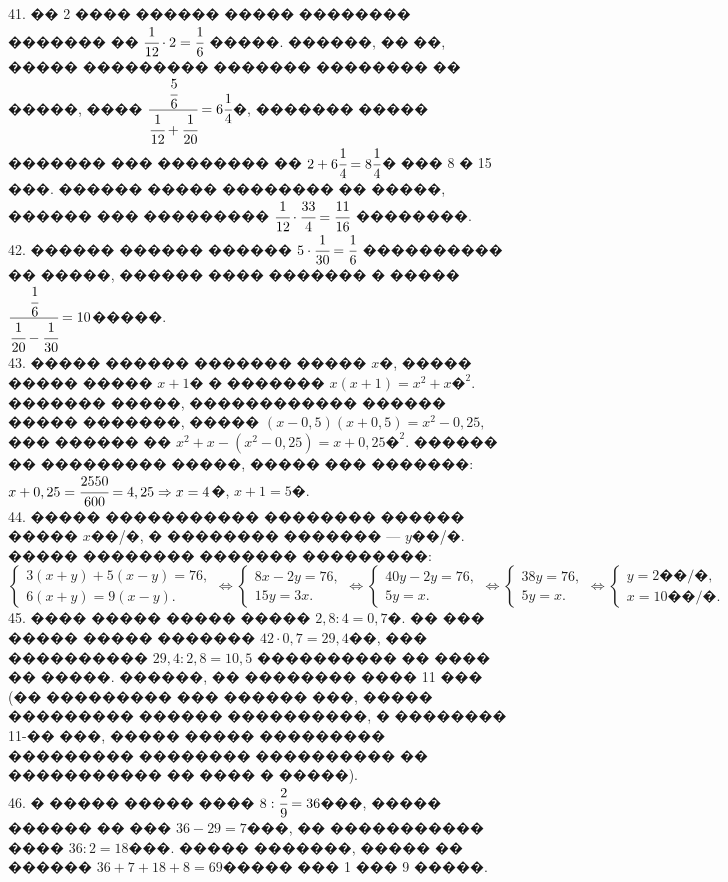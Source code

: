 \documentclass[12pt]{article}
\begin{document}
41. �� 2 ���� ������ ����� �������� ������� �� $\cfrac{1}{12}\cdot2=\cfrac{1}{6}$ �����. ������, �� ��, ����� ��������� ������� �������� �� �����, ���� $\cfrac{\cfrac{5}{6}}{\cfrac{1}{12}+\cfrac{1}{20}}=6\cfrac{1}{4}$�, ������� ����� ������� ��� �������� �� $2+6\cfrac{1}{4}=8\cfrac{1}{4}$� ��� 8 � 15 ���. ������ ����� �������� �� �����, ������ ��� ��������� $\cfrac{1}{12}\cdot\cfrac{33}{4}=\cfrac{11}{16}$ ��������.\\
42. ������ ������ ������ $5\cdot\cfrac{1}{30}=\cfrac{1}{6}$ ���������� �� �����, ������ ���� ������� � ����� $\cfrac{\cfrac{1}{6}}{\cfrac{1}{20}-\cfrac{1}{30}}=10$�����.\\
43. ����� ������ ������� ����� $x$�, ����� ����� ����� $x+1$� � ������� $x(x+1)=x^2+x\text{�}^2.$ ������� �����, ������������ ������ ����� �������, ����� $(x-0,5)(x+0,5)=x^2-0,25,$ ��� ������ �� $x^2+x-(x^2-0,25)=x+0,25\text{�}^2.$ ������ �� ��������� �����, ����� ��� �������: $x+0,25=\cfrac{2550}{600}=4,25\Rightarrow x=4$�, $x+1=5$�.\\
44. ����� ����������� �������� ������ ����� $x$��/�, � �������� ������� --- $y$��/�. ����� �������� ������� ���������: $\begin{cases}3(x+y)+5(x-y)=76,\\
6(x+y)=9(x-y).\end{cases}\Leftrightarrow\begin{cases}8x-2y=76,\\
15y=3x.\end{cases}\Leftrightarrow\begin{cases}40y-2y=76,\\
5y=x.\end{cases}\Leftrightarrow\begin{cases}38y=76,\\
5y=x.\end{cases}\Leftrightarrow\begin{cases} y=2\text{��/�},\\
x=10\text{��/�}.\end{cases}$\\
45. ���� ����� ����� ����� $2,8:4=0,7$�. �� ��� ����� ����� ������� $42\cdot0,7=29,4$��, ��� ���������� $29,4:2,8=10,5$ ���������� �� ���� �� �����. ������, �� �������� ���� 11 ��� (�� ��������� ��� ������ ���, ����� ��������� ������ ����������, � �������� 11-�� ���, ����� ����� ��������� ��������� �������� ���������� �� ����������� �� ���� � �����).\\
46. � ����� ����� ���� $8:\cfrac{2}{9}=36$���, ����� ������ �� ��� $36-29=7$���, �� ����������� ���� $36:2=18$���. ����� �������, ����� �� ������ $36+7+18+8=69$����� ��� 1 ��� 9 �����.\\
\end{document}

